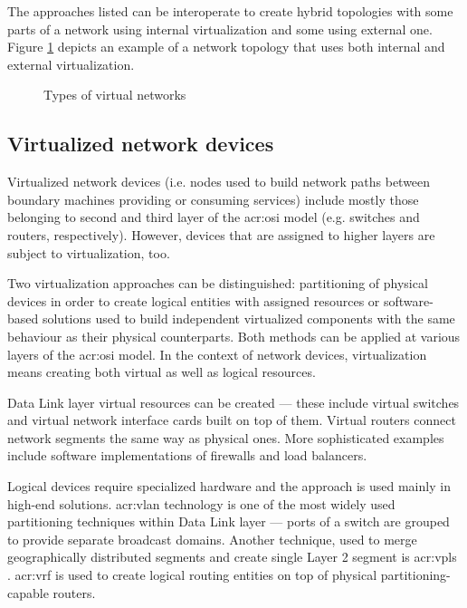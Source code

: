 \documentclass[11pt]{book}
\begin{document}
        The approaches listed can be interoperate to create hybrid topologies with some parts of a network using
        internal virtualization and some using external one. Figure \ref{fig:ctx:nvtypes} depicts an example of a
        network topology that uses both internal and external virtualization.
        

        \begin{figure}[H]
          \caption{Types of virtual networks}
          \label{fig:ctx:nvtypes}
        \end{figure}


      \subsection{Virtualized network devices}

        Virtualized network devices (i.e. nodes used to build network paths between boundary machines providing or
        consuming services) include mostly those belonging to second and third layer of the \gls{acr:osi} model
        (e.g. switches and routers, respectively). However, devices that are assigned to higher layers are subject to
        virtualization, too.

        Two virtualization approaches can be distinguished: partitioning of physical devices in order to create logical
        entities with assigned resources or software-based solutions used to build independent virtualized components
        with the same behaviour as their physical counterparts. Both methods can be applied at various layers of the
        \gls{acr:osi} model. In the context of network devices, virtualization means creating both virtual as well as
        logical resources.

        Data Link layer virtual resources can be created --- these include virtual switches and virtual network
        interface cards built on top of them. Virtual routers connect network segments the same way as physical ones.
        More sophisticated examples include software implementations of firewalls and load balancers.

        Logical devices require specialized hardware and the approach is used mainly in high-end solutions.
        \gls{acr:vlan} technology is one of the most widely used partitioning techniques within Data Link layer ---
        ports of a switch are grouped to provide separate broadcast domains. Another technique, used to merge
        geographically distributed segments and create single Layer 2 segment is \gls{acr:vpls} \cite{moreno}.
        \gls{acr:vrf} is used to create logical routing entities on top of physical partitioning-capable routers.
\end{document}
